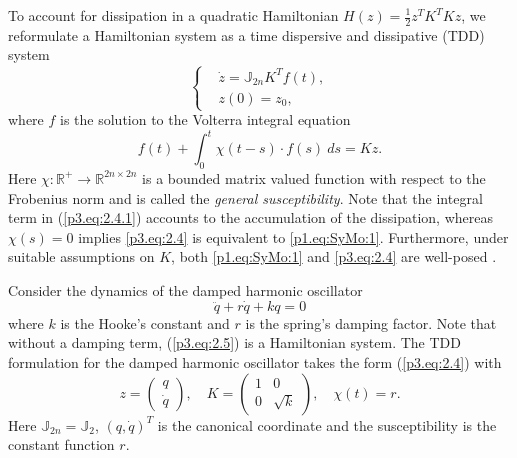 To account for dissipation in a quadratic Hamiltonian $H(z) = \frac 1 2 z^T K^T K  z$, we reformulate a Hamiltonian system as a time dispersive and dissipative (TDD) \cite{figotin2007hamiltonian} system 
\begin{equation} \label{p3.eq:2.4}
	\left\{
	\begin{aligned}
		& \dot {z} = \mathbb J_{2n} K^T f(t), \\
		& z(0) = z_0,
	\end{aligned}
	\right.
\end{equation}
where $f$ is the solution to the Volterra integral equation \cite{jerri1999introduction,corduneanu1991integral}
\begin{equation} \label{p3.eq:2.4.1}
	f(t) + \int_0^t \chi(t-s) \cdot f(s)\ ds = K z.
\end{equation}
Here $\chi:\mathbb R^+\to \mathbb R^{2n\times 2n}$ is a bounded matrix valued function with respect to the Frobenius norm and is called the \emph{general susceptibility}. Note that the integral term in (\ref{p3.eq:2.4.1}) accounts to the accumulation of the dissipation, whereas $\chi(s) = 0$ implies \eqref{p3.eq:2.4} is equivalent to \eqref{p1.eq:SyMo:1}. Furthermore, under suitable assumptions on $K$, both \eqref{p1.eq:SyMo:1} and \eqref{p3.eq:2.4} are well-posed \cite{figotin2007hamiltonian}.

\begin{example} \label{example:2.1}
Consider the dynamics of the damped harmonic oscillator
\begin{equation} \label{p3.eq:2.5}
	\ddot q + r \dot q + k q = 0
\end{equation}
where $k$ is the Hooke's constant and $r$ is the spring's damping factor. Note that without a damping term, (\ref{p3.eq:2.5}) is a Hamiltonian system. The TDD formulation for the damped harmonic oscillator takes the form (\ref{p3.eq:2.4}) with
\begin{equation}
	z = \begin{pmatrix}
	q \\ \dot q
	\end{pmatrix},
       	\quad K = 
	\begin{pmatrix}
	1 & 0 \\
	0 & \sqrt{k}
	\end{pmatrix}, \quad \chi(t) = r.
\end{equation}
Here $\mathbb J_{2n} = \mathbb J_{2}$, $(q,\dot q)^T$ is the canonical coordinate and the susceptibility is the constant function $r$.
\end{example}

